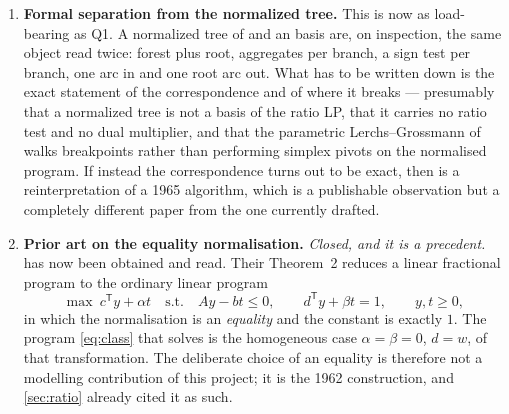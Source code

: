 \begin{enumerate}[label=Q\arabic*.,leftmargin=*]
      Two consequences. First, R7 in \cref{sec:retracted} is confirmed and can
      now be cited precisely instead of being called textbook: tree-plus-$k$
      bases, a working basis of the size of the side rows, and a specialised
      pricing built on them are due to 1977, not to 2017. Second, the phrase
      ``to the best of our knowledge'' in \cref{sec:positioning} survives, for a
      reason \cref{sec:ratio} already states: this whole block works on the
      node--arc incidence matrix with variables on \emph{arcs}, where a basis is
      a spanning tree, while \eqref{eq:class} carries variables on
      \emph{vertices} and difference constraints on arcs --- the
      \emph{transposed} incidence matrix --- where a basis is a forest with
      anchored roots and not a spanning tree of the same graph. The paradigm is
      theirs; the specialisation to the transposed structure is not in any of
      the three papers.

      What remains open is narrower and is the same check as Q1:
      \citet{HolzhauserEtAl2017}, the closest of the block, has been obtained
      but not read term by term, so the claim that the closure-specific closed
      forms are simpler than the generic working-basis algebra is still asserted
      rather than demonstrated for that paper.
\item \textbf{Formal separation from the normalized tree.} This is now as
      load-bearing as Q1. A normalized tree of \citet{LerchsGrossmann1965} and
      an \FS{} basis are, on inspection, the same object read twice: forest
      plus root, aggregates per branch, a sign test per branch, one arc in and
      one root arc out. What has to be written down is the exact statement of
      the correspondence and of where it breaks --- presumably that a normalized
      tree is not a basis of the ratio LP, that it carries no ratio test and no
      dual multiplier, and that the parametric Lerchs--Grossmann of
      \citet{Hochbaum2001} walks breakpoints rather than performing simplex
      pivots on the normalised program. If instead the correspondence turns out
      to be exact, then \FS{} is a reinterpretation of a 1965 algorithm, which
      is a publishable observation but a completely different paper from the one
      currently drafted.
\item \textbf{Prior art on the equality normalisation.} \emph{Closed, and it
      is a precedent.} \citet{CharnesCooper1962} has now been obtained and
      read. Their Theorem~2 reduces a linear fractional program to the ordinary
      linear program
      \[
        \max\ c^{\mathsf T}y + \alpha t
        \quad\text{s.t.}\quad
        Ay - bt \le 0,\qquad
        d^{\mathsf T}y + \beta t = 1,\qquad y,t \ge 0,
      \]
      in which the normalisation is an \emph{equality} and the constant is
      exactly $1$. The program \eqref{eq:class} that \FS{} solves is the
      homogeneous case $\alpha = \beta = 0$, $d = w$, of that transformation.
      The deliberate choice of an equality is therefore not a modelling
      contribution of this project; it is the 1962 construction, and
      \cref{sec:ratio} already cited it as such.


\end{enumerate}
